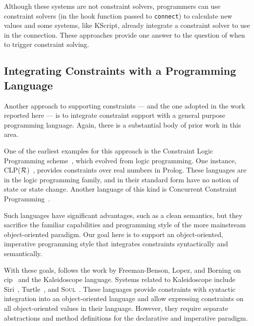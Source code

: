 Although these systems are not constraint solvers, programmers can use
constraint solvers (in the hook function passed to
\lstinline{connect}) to calculate new values and some systems, like
KScript, already integrate a constraint solver to use in the
connection. These approaches provide one answer to the question of 
when to trigger constraint solving.

\subsection{Integrating Constraints with a Programming Language}

Another approach to supporting constraints --- and the one adopted in
the work reported here --- is to integrate constraint support with a
general purpose programming language.  Again, there is a substantial body of
prior work in this area.  

One of the earliest examples for this approach is the Constraint Logic
Programming scheme~\cite{jaffar-popl-1987}, which evolved from logic
programming. One instance, CLP($\cal R$)~\cite{jaffar-toplas-1992},
provides constraints over real numbers in Prolog. These languages are
in the logic programming family, and in their standard form have no
notion of state or state change. Another language of this kind is
Concurrent Constraint Programming~\cite{saraswat-book}.

Such languages have significant advantages, such as a clean semantics,
but they sacrifice the familiar capabilities and programming
style of the more mainstream object-oriented paradigm.  Our goal here is to
support an object-oriented, imperative programming style that
integrates constraints syntactically and semantically.

With these goals, \langname follows the work by Freeman-Benson, Lopez,
and Borning on
\ac{cip}~\cite{freeman-benson-ecoop-1992,lopez-ecoop-1994,lopez-oopsla-1994,lopez-asi-1994}
and the Kaleidoscope language. Systems related to Kaleidoscope include
Siri~\cite{horn-oopsla-1992}, Turtle~\cite{grabmuller2004turtle}, and
\textsc{Soul}~\cite{d2004seamless}. These languages provide
constraints with syntactic integration into an object-oriented
language and allow expressing constraints on all object-oriented
values in their language. However, they require separate abstractions
and method definitions for the declarative and imperative paradigm.

